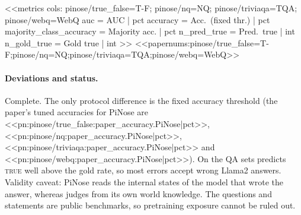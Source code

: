 <<metrics
cols: pinose/true_false=T-F; pinose/nq=NQ; pinose/triviaqa=TQA; pinose/webq=WebQ
auc = AUC | pct
accuracy = Acc.\ (fixed thr.) | pct
majority_class_accuracy = Majority acc. | pct
n_pred_true = Pred.\ true | int
n_gold_true = Gold true | int
>>
<<papernums:pinose/true_false=T-F;pinose/nq=NQ;pinose/triviaqa=TQA;pinose/webq=WebQ>>

\paragraph{Deviations and status.} Complete. The only protocol difference is the fixed accuracy threshold (the
paper's tuned accuracies for PiNose are
<<pn:pinose/true_false:paper_accuracy.PiNose|pct>>, <<pn:pinose/nq:paper_accuracy.PiNose|pct>>,
<<pn:pinose/triviaqa:paper_accuracy.PiNose|pct>> and <<pn:pinose/webq:paper_accuracy.PiNose|pct>>). On the QA sets
\jev{} predicts \textsc{true} well above the gold rate, so most errors accept wrong Llama2 answers. Validity caveat:
PiNose reads the internal states of the model that wrote the answer, whereas \jev{} judges from its own world
knowledge. The questions and statements are public benchmarks, so pretraining exposure cannot be ruled out.
